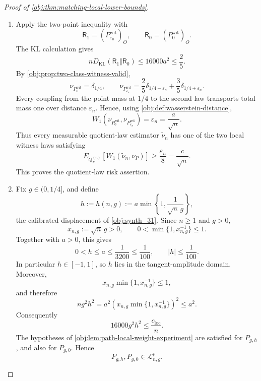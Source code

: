 \begin{proof}[Proof of \cref{obj:thm:matching-local-lower-bounds}]
\begin{enumerate}
\item Apply the two-point inequality with
\[
\mathsf R_1=(P_{\varepsilon_n}^{\mathrm{wit}})_O,
\qquad
\mathsf R_0=(P_0^{\mathrm{wit}})_O .
\]
The KL calculation gives
\[
nD_{\mathrm{KL}}(\mathsf R_1\Vert\mathsf R_0)
\le
16000a^2
\le
\frac25 .
\]
By \cref{obj:prop:two-class-witness-valid},
\[
\nu_{P_0^{\mathrm{wit}}}=\delta_{1/4},
\qquad
\nu_{P_{\varepsilon_n}^{\mathrm{wit}}}
=
\frac25\delta_{1/4-\varepsilon_n}
+
\frac35\delta_{1/4+\varepsilon_n}.
\]
Every coupling from the point mass at \(1/4\) to the second law transports total mass one over distance \(\varepsilon_n\).  Hence, using \cref{obj:def:wasserstein-distance},
\[
W_1\!\left(\nu_{P_0^{\mathrm{wit}}},\nu_{P_{\varepsilon_n}^{\mathrm{wit}}}\right)
=
\varepsilon_n
=
\frac a{\sqrt n}.
\]
Thus every measurable quotient-law estimator \(\widetilde\nu_n\) has one of the two local witness laws satisfying
\[
E_{Q_P^{(n)}}\!\left[W_1(\widetilde\nu_n,\nu_P)\right]
\ge
\frac{\varepsilon_n}{8}
=
\frac{c}{\sqrt n}.
\]
This proves the quotient-law risk assertion. %

\item Fix \(g\in(0,1/4]\), and define
\[
h:=h(n,g):=a\min\left\{1,\frac1{\sqrt n\,g}\right\},
\]
the calibrated displacement of \cref{obj:synth_31}.  Since \(n\ge1\) and \(g>0\),
\[
x_{n,g}:=\sqrt n\,g>0,
\qquad
0<\min\{1,x_{n,g}^{-1}\}\le1.
\]
Together with \(a>0\), this gives
\[
0<h\le a\le\frac1{3200}\le\frac1{100},
\qquad
|h|\le\frac1{100}.
\]
In particular \(h\in[-1,1]\), so \(h\) lies in the tangent-amplitude domain.  Moreover,
\[
x_{n,g}\min\{1,x_{n,g}^{-1}\}\le1,
\]
and therefore
\[
n g^2 h^2
=
a^2\left(x_{n,g}\min\{1,x_{n,g}^{-1}\}\right)^2
\le
a^2 .
\]
Consequently
\[
16000g^2h^2\le\frac{c_{\mathrm{loc}}}{n}.
\]
The hypotheses of \cref{obj:lem:path-local-weight-experiment} are satisfied for \(P_{g,h}\), and also for \(P_{g,0}\).  Hence
\[
P_{g,h},P_{g,0}\in\mathcal L_{n,g}^{p}.
\] %


\end{enumerate}
\end{proof}
